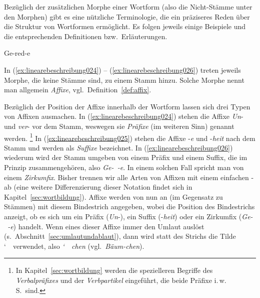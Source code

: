 Bezüglich der zusätzlichen Morphe einer Wortform (also die Nicht-Stämme unter den Morphen) gibt es eine nützliche Terminologie, die ein präziseres Reden über die Struktur von Wortformen ermöglicht.
Es folgen jeweils einige Beispiele und die entsprechenden Definitionen bzw.\ Erläuterungen.


\begin{exe}
  \ex\label{ex:linearebeschreibung024}
  \begin{xlist}
  \end{xlist}
  \ex\label{ex:linearebeschreibung025}
  \begin{xlist}
  \end{xlist}
  \ex\label{ex:linearebeschreibung026}{Ge-red-e}
\end{exe}


In (\ref{ex:linearebeschreibung024}) -- (\ref{ex:linearebeschreibung026}) treten jeweils Morphe, die keine Stämme sind, zu einem Stamm hinzu.
Solche Morphe nennt man allgemein \textit{Affixe}, vgl.\ Definition~\ref{def:affix}.



Bezüglich der Position der Affixe innerhalb der Wortform lassen sich drei Typen von Affixen ausmachen.
In (\ref{ex:linearebeschreibung024}) stehen die Affixe \textit{Un}- und \textit{ver}- vor dem Stamm, weswegen sie \textit{Präfixe} (im weiteren Sinn) genannt werden.%
\footnote{In Kapitel~\ref{sec:wortbildung} werden die spezielleren Begriffe des \textit{Verbalpräfixes} und der \textit{Verbpartikel} eingeführt, die beide Präfixe i.\,w.\,S.\ sind.}
In (\ref{ex:linearebeschreibung025}) stehen die Affixe -\textit{e} und -\textit{heit} nach dem Stamm und werden als \textit{Suffixe} bezeichnet.
In (\ref{ex:linearebeschreibung026}) wiederum wird der Stamm umgeben von einem Präfix und einem Suffix, die im Prinzip zusammengehören, also \textit{Ge-~-e}.
In einem solchen Fall spricht man von einem \textit{Zirkumfix}.
Bisher trennen wir alle Arten von Affixen mit einem einfachen - ab (eine weitere Differenzierung dieser Notation findet sich in Kapitel~\ref{sec:wortbildung}).
Affixe werden von nun an (im Gegensatz zu Stämmen) mit diesem Bindestrich angegeben, wobei die Position des Bindestrichs anzeigt, ob es sich um ein Präfix (\textit{Un}-), ein Suffix (-\textit{heit}) oder ein Zirkumfix (\textit{Ge-~-e}) handelt.
Wenn eines dieser Affixe immer den Umlaut auslöst (s.\ Abschnitt~\ref{sec:umlautundablaut}), dann wird statt des Strichs die Tilde \char`~\ verwendet, also \zB \mbox{\textit{\char`~ chen}} (vgl.\ \textit{Bäum-chen}).

